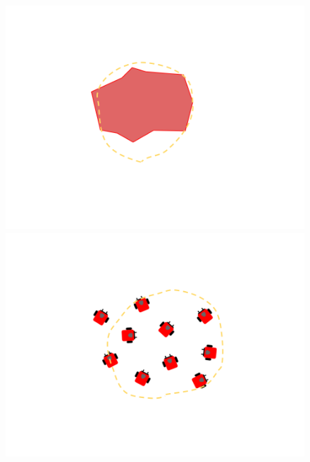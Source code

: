 	\begin{subfigure}{0.48\textwidth}
		\includegraphics[width=\linewidth]{../Selection_Fuzz_X.png}
		\includegraphics[width=\linewidth]{../Selection_Fuzz_10.png}

\end{subfigure}
